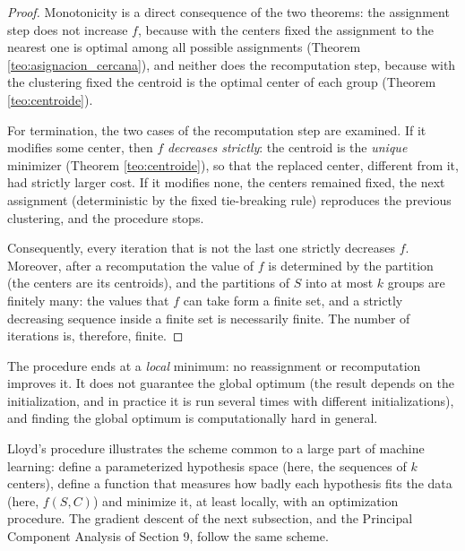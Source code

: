 \documentclass[11pt, a4paper]{article}
\begin{document}
\begin{proof}
Monotonicity is a direct consequence of the two theorems: the assignment step does not increase $f$, because with the centers fixed the assignment to the nearest one is optimal among all possible assignments (Theorem \ref{teo:asignacion_cercana}), and neither does the recomputation step, because with the clustering fixed the centroid is the optimal center of each group (Theorem \ref{teo:centroide}).

For termination, the two cases of the recomputation step are examined. If it modifies some center, then $f$ \emph{decreases strictly}: the centroid is the \emph{unique} minimizer (Theorem \ref{teo:centroide}), so that the replaced center, different from it, had strictly larger cost. If it modifies none, the centers remained fixed, the next assignment (deterministic by the fixed tie-breaking rule) reproduces the previous clustering, and the procedure stops.

Consequently, every iteration that is not the last one strictly decreases $f$. Moreover, after a recomputation the value of $f$ is determined by the partition (the centers are its centroids), and the partitions of $S$ into at most $k$ groups are finitely many: the values that $f$ can take form a finite set, and a strictly decreasing sequence inside a finite set is necessarily finite. The number of iterations is, therefore, finite.
\end{proof}

\obs The procedure ends at a \emph{local} minimum: no reassignment or recomputation improves it. It does not guarantee the global optimum (the result depends on the initialization, and in practice it is run several times with different initializations), and finding the global optimum is computationally hard in general.

\obs Lloyd's procedure illustrates the scheme common to a large part of machine learning: define a parameterized hypothesis space (here, the sequences of $k$ centers), define a function that measures how badly each hypothesis fits the data (here, $f(S, C)$) and minimize it, at least locally, with an optimization procedure. The gradient descent of the next subsection, and the Principal Component Analysis of Section 9, follow the same scheme.
\end{document}
